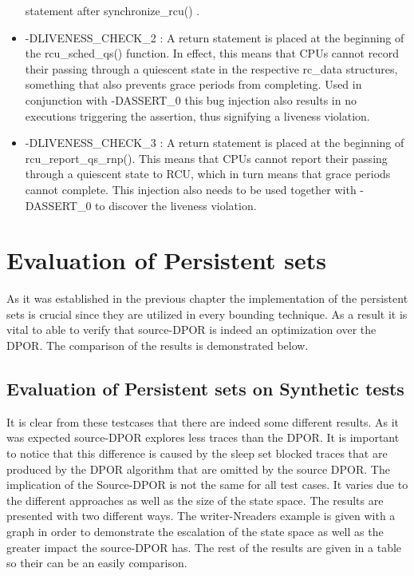 \begin{itemize}
statement after synchronize\_rcu() .
\item
-DLIVENESS\_CHECK\_2 : A return statement is placed at the beginning of the rcu\_sched\_qs() function. In effect, this means 
that CPUs cannot record their passing through a
quiescent state in the respective rc\_data structures, something that also prevents grace periods from 
completing. Used in conjunction with -DASSERT\_0 this bug injection
also results in no executions triggering the assertion, thus signifying a liveness violation.
\item
-DLIVENESS\_CHECK\_3 : A return statement is placed at the beginning of rcu\_report\_qs\_rnp(). 
This means that CPUs cannot report their passing through a quiescent state to
RCU, which in turn means that grace periods cannot complete. This injection also needs to be used together 
with -DASSERT\_0 to discover the liveness violation.

\end{itemize}

\section{Evaluation of Persistent sets}
As it was established in the previous chapter the implementation of the persistent sets
is crucial since they are utilized in every bounding technique. As a result it is vital to
able to verify that source-DPOR is indeed an optimization over the DPOR. The comparison of the results is demonstrated below.


\subsection{Evaluation of Persistent sets on Synthetic tests}
It is clear from these testcases that there are indeed some different results. As it was expected source-DPOR explores less traces than the DPOR. It is important
to notice that this difference is caused by the sleep set blocked traces that are produced by the DPOR algorithm that are omitted by the source DPOR. The implication
of the Source-DPOR is not the same for all test cases. It varies due to the different approaches as well as the size of the state space. The results are presented with two different ways. 
The writer-Nreaders example is given with a graph in order to demonstrate the escalation of the state space as well as the greater impact the source-DPOR has. The rest of the
results are given in a table so their can be an easily comparison.


